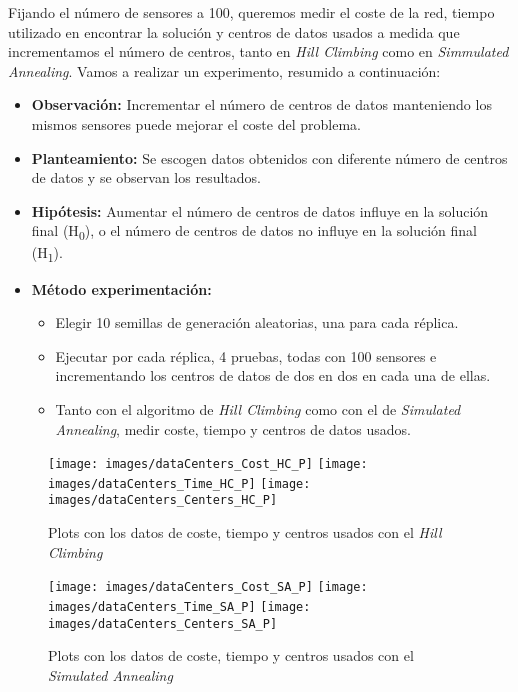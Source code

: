 \documentclass{article}
\begin{document}
\begin{enumerate}
  Fijando el número de sensores a 100, queremos medir el coste de la red, tiempo utilizado en encontrar la solución y centros de datos usados a medida que incrementamos el número de centros, tanto en \textit{Hill Climbing} como en \textit{Simmulated Annealing}. Vamos a realizar un experimento, resumido a continuación:
  \begin{itemize}
      \item \textbf{Observación:} Incrementar el número de centros de datos manteniendo los mismos sensores puede mejorar el coste del problema.
      \item \textbf{Planteamiento:} Se escogen datos obtenidos con diferente número de centros de datos y se observan los resultados.
      \item \textbf{Hipótesis:} Aumentar el número de centros de datos influye en la solución final (H\textsubscript{0}), o el número de centros de datos no influye en la solución final (H\textsubscript{1}).
      \item \textbf{Método experimentación:}
        \begin{itemize}
            \item Elegir 10 semillas de generación aleatorias, una para cada réplica.
            \item Ejecutar por cada réplica, 4 pruebas, todas con 100 sensores e incrementando los centros de datos de dos en dos en cada una de ellas.
            \item Tanto con el algoritmo de \textit{Hill Climbing} como con el de \textit{Simulated Annealing}, medir coste, tiempo y centros de datos usados.
        \end{itemize}
  \end{itemize}

  \begin{figure}[ht]
    \centering
    \texttt{[image: images/dataCenters\_Cost\_HC\_P]}\hfill
    \texttt{[image: images/dataCenters\_Time\_HC\_P]}\hfill
    \texttt{[image: images/dataCenters\_Centers\_HC\_P]}
    \caption{Plots con los datos de coste, tiempo y centros usados con el \textit{Hill Climbing}}
    \label{fig:DCCH}
  \end{figure}
  \begin{figure}[ht]
    \centering
    \texttt{[image: images/dataCenters\_Cost\_SA\_P]}\hfill
    \texttt{[image: images/dataCenters\_Time\_SA\_P]}\hfill
    \texttt{[image: images/dataCenters\_Centers\_SA\_P]}
    \caption{Plots con los datos de coste, tiempo y centros usados con el \textit{Simulated Annealing}}
    \label{fig:DCSA}
  \end{figure}


\end{enumerate}
\end{document}
